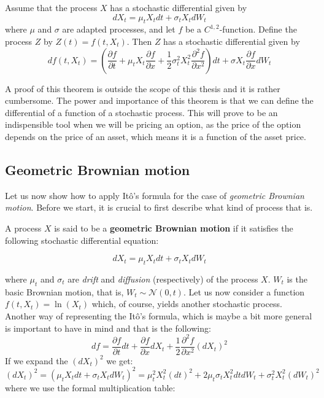 \documentclass[times, utf8, diplomski]{fer}
\begin{document}
\begin{theorem}[It\^{o}'s Lemma]
Assume that the process $X$ has a stochastic differential given by $$dX_t = \mu_t X_t dt + \sigma_t X_t dW_t$$ where $\mu$ and $\sigma$ are adapted processes, and let $f$ be a $C^{1,2}$-function. Define the process $Z$ by $Z(t) = f(t,X_t)$. Then $Z$ has a stochastic differential given by 
$$df(t, X_t) = \left(\frac{\partial f}{\partial t} + \mu_t X_t \frac{\partial f}{\partial x}+\frac{1}{2}\sigma_t^2 X_t^2 \frac{\partial^2f}{\partial x^2}\right)dt + \sigma X_t \frac{\partial f}{\partial x}dW_t$$
\end{theorem}
\noindent A proof of this theorem is outside the scope of this thesis and it is rather cumbersome. The power and importance of this theorem is that we can define the differential of a function of a stochastic process. This will prove to be an indispensible tool when we will be pricing an option, as the price of the option depends on the price of an asset, which means it is a function of the asset price.

\subsection{Geometric Brownian motion} \label{section_gbm}
Let us now show how to apply It\^{o}'s formula for the case of \textit{geometric Brownian motion}. Before we start, it is crucial to first describe what kind of process that is. 

\begin{definition}
A process $X$ is said to be a \textbf{geometric Brownian motion} if it satisfies the following stochastic differential equation:

$$dX_t = \mu_t X_t dt + \sigma_t X_t dW_t$$

\end{definition}

\noindent where $\mu_t$ and $\sigma_t$ are \textit{drift} and \textit{diffusion} (respectively) of the process $X$. $W_t$ is the basic Brownian motion, that is, $W_t \sim \mathcal{N}(0,t)$. Let us now consider a function $f(t,X_t) = \ln(X_t)$ which, of course, yields another stochastic process. Another way of representing the It\^{o}'s formula, which is maybe a bit more general is important to have in mind and that is the following: $$df = \frac{\partial f}{\partial t}dt + \frac{\partial f}{\partial x}dX_t + \frac{1}{2}\frac{\partial^2 f}{\partial x^2}(dX_t)^2$$
If we expand the $(dX_t)^2$ we get: $$(dX_t)^2 = (\mu_t X_t dt + \sigma_t X_t dW_t)^2 = \mu_t^2 X_t^2 (dt)^2 + 2\mu_t\sigma_tX_t^2dtdW_t + \sigma_t^2X_t^2(dW_t)^2$$ where we use the formal multiplication table: 
\end{document}
